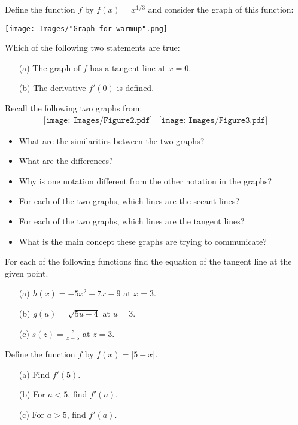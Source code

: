 \documentclass[handout,nooutcomes]{ximera}
\begin{document}
\newpage
\begin{problem}
  \label{problem:vertical-tangent-line}
  Define the function $f$ by $f(x) = x^{1/3}$ and consider the graph of this function:
  \begin{image}
    \texttt{[image: Images/"Graph for warmup".png]}
  \end{image}

  Which of the following two statements are true:
  \begin{itemize}
    \item[(a)]
      The graph of $f$ has a tangent line at $x = 0$.
    \item[(b)]
      The derivative $f'(0)$ is defined.
  \end{itemize}
\end{problem}

\begin{problem}
  \label{problem:two-different-characterizations}
    Recall the following two graphs from:
  \[
    \begin{array}{lr}
      \texttt{[image: Images/Figure2.pdf]} &		   \texttt{[image: Images/Figure3.pdf]}
    \end{array}
  \]
  \begin{itemize}
    \item
      What are the similarities between the two graphs?
    \item 
      What are the differences?
    \item 
      Why is one notation different from the other notation in the graphs?
    \item 
      For each of the two graphs, which lines are the secant lines?
    \item 
      For each of the two graphs, which lines are the tangent lines?
    \item 
      What is the main concept these graphs are trying to communicate?
  \end{itemize}
\end{problem}

\begin{problem}
  \label{problem:find-equation-of-tangent-line}
    For each of the following functions find the equation of the tangent line at the given point.
  \begin{itemize}
    \item[(a)]
      $h(x) = -5x^2 + 7x - 9$ at $x = 3$.

    \item[(b)]
      $g(u) = \sqrt{5u-4}$ at $u = 3$.

    \item[(c)]
      $\displaystyle s(z) = \frac{z}{z-5}$ at $z = 3$.
  \end{itemize}
\end{problem}

\begin{problem}
  \label{problem:nondifferentiable-at-point}
   Define the function $f$ by $f(x) = |5-x|$.
  \begin{itemize}
    \item[(a)]
      Find $f'(5)$.

    \item[(b)]
      For $a < 5$, find $f'(a)$.

    \item[(c)]
      For $a > 5$, find $f'(a)$.
  \end{itemize}

\end{problem}
\end{document}
